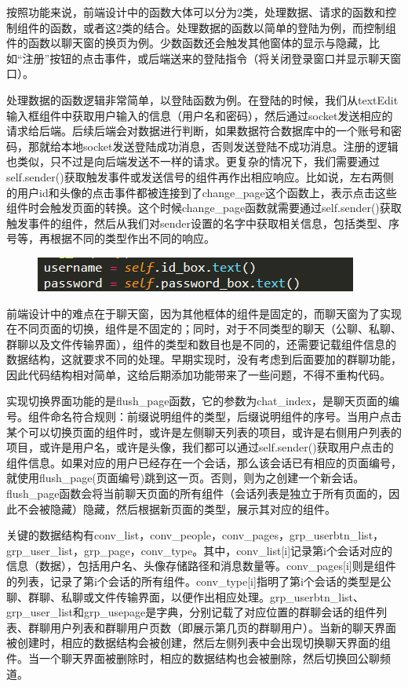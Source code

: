 \documentclass[12pt]{article} %
\begin{document}
\begin{sloppypar}
按照功能来说，前端设计中的函数大体可以分为2类，处理数据、请求的函数和控制组件的函数，或者这2类的结合。处理数据的函数以简单的登陆为例，而控制组件的函数以聊天窗的换页为例。少数函数还会触发其他窗体的显示与隐藏，比如“注册”按钮的点击事件，或后端送来的登陆指令（将关闭登录窗口并显示聊天窗口）。

处理数据的函数逻辑非常简单，以登陆函数为例。在登陆的时候，我们从textEdit输入框组件中获取用户输入的信息（用户名和密码），然后通过socket发送相应的请求给后端。后续后端会对数据进行判断，如果数据符合数据库中的一个账号和密码，那就给本地socket发送登陆成功消息，否则发送登陆不成功消息。注册的逻辑也类似，只不过是向后端发送不一样的请求。更复杂的情况下，我们需要通过self.sender()获取触发事件或发送信号的组件再作出相应响应。比如说，左右两侧的用户id和头像的点击事件都被连接到了change\_page这个函数上，表示点击这些组件时会触发页面的转换。这个时候change\_page函数就需要通过self.sender()获取触发事件的组件，然后从我们对sender设置的名字中获取相关信息，包括类型、序号等，再根据不同的类型作出不同的响应。

\begin{figure}[htbp]
	\centering
	\includegraphics[width=0.6\linewidth]{figure/fig1.png}
\end{figure}

前端设计中的难点在于聊天窗，因为其他框体的组件是固定的，而聊天窗为了实现在不同页面的切换，组件是不固定的；同时，对于不同类型的聊天（公聊、私聊、群聊以及文件传输界面），组件的类型和数目也是不同的，还需要记载组件信息的数据结构，这就要求不同的处理。早期实现时，没有考虑到后面要加的群聊功能，因此代码结构相对简单，这给后期添加功能带来了一些问题，不得不重构代码。

实现切换界面功能的是flush\_page函数，它的参数为chat\_index，是聊天页面的编号。组件命名符合规则：前缀说明组件的类型，后缀说明组件的序号。当用户点击某个可以切换页面的组件时，或许是左侧聊天列表的项目，或许是右侧用户列表的项目，或许是用户名，或许是头像，我们都可以通过self.sender()获取用户点击的组件信息。如果对应的用户已经存在一个会话，那么该会话已有相应的页面编号，就使用flush\_page(页面编号)跳到这一页。否则，则为之创建一个新会话。flush\_page函数会将当前聊天页面的所有组件（会话列表是独立于所有页面的，因此不会被隐藏）隐藏，然后根据新页面的类型，展示其对应的组件。

关键的数据结构有conv\_list，conv\_people，conv\_pages，grp\_userbtn\_list，grp\_user\_list，grp\_page，conv\_type。其中，conv\_list[i]记录第i个会话对应的信息（数据），包括用户名、头像存储路径和消息数量等。conv\_pages[i]则是组件的列表，记录了第i个会话的所有组件。conv\_type[i]指明了第i个会话的类型是公聊、群聊、私聊或文件传输界面，以便作出相应处理。grp\_userbtn\_list、grp\_user\_list和grp\_usepage是字典，分别记载了对应位置的群聊会话的组件列表、群聊用户列表和群聊用户页数（即展示第几页的群聊用户）。当新的聊天界面被创建时，相应的数据结构会被创建，然后左侧列表中会出现切换聊天界面的组件。当一个聊天界面被删除时，相应的数据结构也会被删除，然后切换回公聊频道。


\end{sloppypar}
\end{document}
